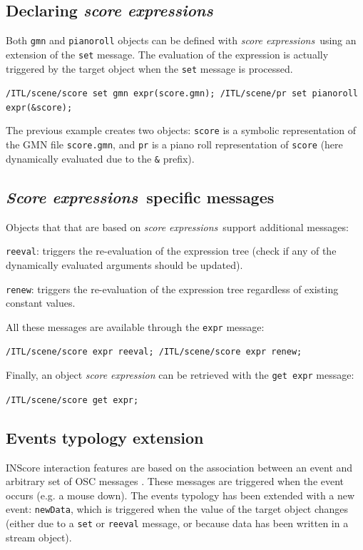 \documentclass{article}
\newcommand{\OSC}[1]{\texttt{#1}}
\newcommand{\sExpr}{\emph{score expressions}}
\newcommand{\SExpr}{\emph{Score expressions}}
\let\olditemize\itemize
\let\oldenditemize\enditemize
\renewenvironment{itemize} 	{\olditemize \setlength{\itemsep}{1mm}}{\oldenditemize}
\newcommand{\sample}	[1]			{\vspace{-0.2em}\begin{center}\colorbox{mygrey}{\begin{minipage}[t]{0.95\columnwidth} {\small \texttt{#1}}\end{minipage}}\end{center}}
\begin{document}
\subsection{Declaring \sExpr}
\label{declaringExpr}
Both \OSC{gmn} and \OSC{pianoroll} objects can be defined with \sExpr\ using an extension of the \OSC{set} message. The evaluation of the expression is actually triggered by the target object when the \OSC{set} message is processed.

\sample{/ITL/scene/score set gmn expr(score.gmn);
/ITL/scene/pr set pianoroll expr(\&score);
}

The previous example creates two objects: \OSC{score} is a symbolic representation of the GMN file \OSC{score.gmn}, and \OSC{pr} is a piano roll representation of \OSC{score} (here dynamically evaluated due to the \OSC{\&} prefix).


\subsection{\SExpr\ specific messages}
\label{exprMsgs}
Objects that that are based on \sExpr\ support additional messages:

\begin{itemize}
\item \OSC{reeval}: triggers the re-evaluation of the expression tree (check if any of the dynamically evaluated arguments should be updated).
\item \OSC{renew}: triggers the re-evaluation of the expression tree regardless of existing constant values. 
\end{itemize}

All these messages are available through the \OSC{expr} message:
\sample{/ITL/scene/score expr reeval;
/ITL/scene/score expr renew;
}

Finally, an object \emph{score expression} can be retrieved with the \OSC{get expr} message:
\sample{/ITL/scene/score get expr;}

\subsection{Events typology extension}
\label{exprEvents}

INScore interaction features are based on the association between an event and arbitrary set of OSC messages \cite{Fober:13b}. These messages are triggered when the event occurs (e.g. a mouse down).
The events typology has been extended with a new event: \OSC{newData}, which is triggered when the value of the target object changes (either due to a \OSC{set} or \OSC{reeval} message, or because data has been written in a stream object).
\end{document}
